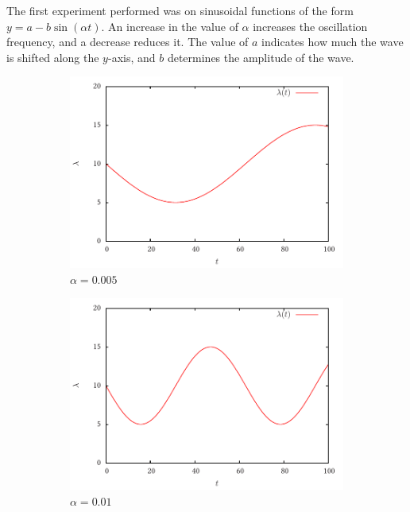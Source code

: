 \documentclass[a4paper,11pt]{article}
\begin{document}
The first experiment performed was on sinusoidal functions of the form
$y=a-b\sin(\alpha t)$. An increase in the value of $\alpha$ increases the
oscillation frequency, and a decrease reduces it. The value of $a$ indicates how
much the wave is shifted along the $y$-axis, and $b$ determines the
amplitude of the wave.
\begin{figure}
\begin{subfigure}{0.5\textwidth}
\includegraphics[width=\textwidth]{prelim_sine_005}
\caption{$\alpha=0.005$}
\end{subfigure}
\begin{subfigure}{0.5\textwidth}
\includegraphics[width=\textwidth]{prelim_sine_01}
\caption{$\alpha=0.01$}
\end{subfigure}
\begin{subfigure}{0.5\textwidth}

\end{subfigure}
\end{figure}
\end{document}
